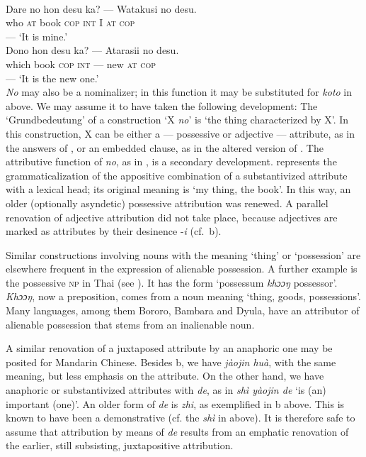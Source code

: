 \ea\label{ex:E40}
\langinfo{\LangJap}{}{} \\
 \ea
 \gll Dare  no  hon  desu  ka?  ---  Watakusi  no  desu.\\
  who  \textsc{at}  book  \textsc{cop}  \textsc{int}  {}  I  \textsc{at}  \textsc{cop}\\
 ---  {‘It is mine.’}\\
\ex
\gll  Dono  hon  desu  ka?  ---  Atarasii  no  desu.\\
 which  book \textsc{cop}  \textsc{int} {} --- new  \textsc{at}  \textsc{cop}\\
 --- {‘It is the new one.’}\\
\z
\z 
\noindent\label{page74b}\textit{No} may also be a nominalizer; in this function it may be substituted for \textit{koto} in  above. We may assume it to have taken the following development: The ‘Grundbedeutung’ of a construction ‘X \textit{no}’ is ‘the thing characterized by X’. In this construction, X can be either a — possessive or adjective — attribute, as in the answers of , or an embedded clause, as in the altered version of . The attributive function of \textit{no}, as in , is a secondary development.  represents the grammaticalization of the appositive combination of a substantivized attribute with a lexical head; its original meaning is ‘my thing, the book’. In this way, an older (optionally asyndetic) possessive attribution was renewed. A parallel renovation of adjective attribution did not take place, because adjectives are marked as attributes by their desinence -\textit{i} (cf.~b).

\label{page75}Similar constructions involving nouns with the meaning ‘thing’ or ‘possession’ are elsewhere frequent in the expression of alienable possession. A further example is the possessive \textsc{np} in Thai (see \citealt[389]{MallinsonEtAl1981}). It has the form ‘possessum \textit{khɔɔŋ} possessor’. \textit{Khɔɔŋ}, now a preposition, comes from a noun meaning ‘thing, goods, possessions’. Many languages, among them Bororo, Bambara and Dyula, have an attributor of alienable possession that stems from an inalienable noun.

A similar renovation of a juxtaposed attribute by an anaphoric one may be posited for Mandarin Chinese. Besides b, we have \textit{jàojin huà}, with the same meaning, but less emphasis on the attribute. On the other hand, we have anaphoric or substantivized attributes with \textit{de}, as in \textit{shì yàojin de} ‘is (an) important (one)’. An older form of \textit{de} is \textit{zhi}, as exemplified in b above. This is known to have been a demonstrative (cf. the \textit{shì} in  above). It is therefore safe to assume that attribution by means of \textit{de} results from an emphatic renovation of the earlier, still subsisting, juxtapositive attribution.


